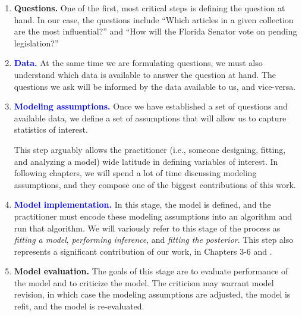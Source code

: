 \begin{enumerate}
\item \textbf{Questions.} One of the first, most critical steps is
  defining the question at hand.  In our case, the questions include
  ``Which articles in a given collection are the most influential?''
  and ``How will the Florida Senator vote on pending legislation?''

\item \textcolor{blue}{\textbf{Data.}} At the same time we are
  formulating questions, we must also understand which data is
  available to answer the question at hand.  The questions we ask will
  be informed by the data available to us, and vice-versa.

\item \textcolor{blue}{\textbf{Modeling assumptions.}} Once we have
  established a set of questions and available data, we define a set
  of assumptions that will allow us to capture statistics of interest.

  This step arguably allows the practitioner (i.e., someone designing,
  fitting, and analyzing a model) wide latitude in defining variables
  of interest.  In following chapters, we will spend a lot of time
  discussing modeling assumptions, and they compose one of the biggest
  contributions of this work.


  \item \textcolor{blue}{\textbf{Model implementation.}} In this stage, the model is
  defined, and the practitioner must encode these modeling assumptions
  into an algorithm and run that algorithm.  We will variously refer
  to this stage of the process as \emph{fitting a model},
  \emph{performing inference}, and \emph{fitting the posterior}.  This
  step also represents a significant contribution of our work, in
  Chapters 3-6 and .

  \item \textbf{Model evaluation.} The goals of this stage are to
    evaluate performance of the model and to criticize the model.
    The criticism may warrant model revision, in which case the
    modeling assumptions are adjusted, the model is refit, and the
    model is re-evaluated.


\end{enumerate}
